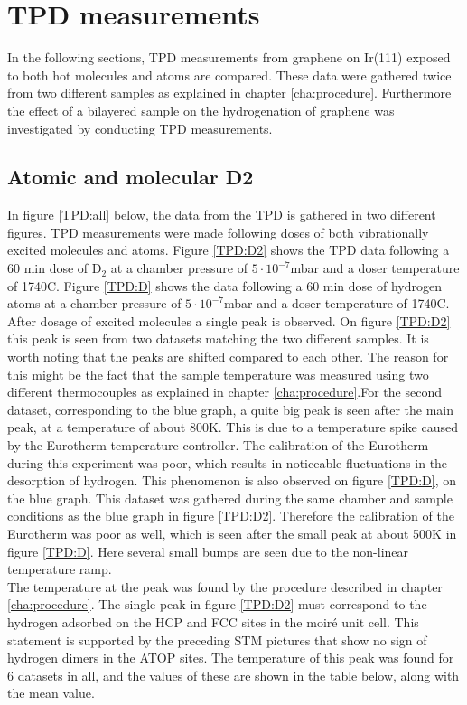 \section{TPD measurements}
In the following sections, TPD measurements from graphene on Ir(111) exposed to both hot molecules and atoms are compared. These data were gathered twice from two different samples as explained in chapter \ref{cha:procedure}. Furthermore the effect of a bilayered sample on the hydrogenation of graphene was investigated by conducting TPD measurements.

\subsection{Atomic and molecular D2}

In figure \ref{TPD:all} below, the data from the TPD is gathered in two different figures. TPD measurements were made following doses of both vibrationally excited molecules and atoms. Figure \ref{TPD:D2} shows the TPD data following a 60 min dose of D$_2$ at a chamber pressure of $5\cdot 10^{-7}$mbar and a doser temperature of 1740\degree C. Figure \ref{TPD:D} shows the data following a 60 min dose of hydrogen atoms at a chamber pressure of $5\cdot 10^{-7}$mbar and a doser temperature of 1740\degree C.\\
After dosage of excited molecules a single peak is observed. On figure \ref{TPD:D2} this peak is seen from two datasets matching the two different samples. It is worth noting that the peaks are shifted compared to each other. The reason for this might be the fact that the sample temperature was measured using two different thermocouples as explained in chapter \ref{cha:procedure}.For the second dataset, corresponding to the blue graph, a quite big peak is seen after the main peak, at a temperature of about 800K. This is due to a temperature spike caused by the Eurotherm temperature controller. The calibration of the Eurotherm during this experiment was poor, which results in noticeable fluctuations in the desorption of hydrogen. This phenomenon is also observed on figure \ref{TPD:D}, on the blue graph. This dataset was gathered during the same chamber and sample conditions as the blue graph in figure \ref{TPD:D2}. Therefore the calibration of the Eurotherm was poor as well, which is seen after the small peak at about 500K in figure \ref{TPD:D}. Here several small bumps are seen due to the non-linear temperature ramp.\\
The temperature at the peak was found by the procedure described in chapter \ref{cha:procedure}. The single peak in figure \ref{TPD:D2} must correspond to the hydrogen adsorbed on the HCP and FCC sites in the moiré unit cell. This statement is supported by the preceding STM pictures that show no sign of hydrogen dimers in the ATOP sites. The temperature of this peak was found for 6 datasets in all, and the values of these are shown in the table below, along with the mean value.\\
